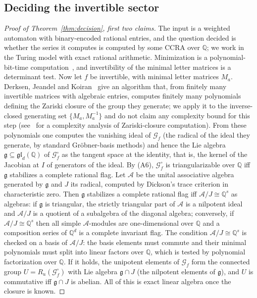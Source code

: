 \documentclass[acmlarge,screen,11pt,nonacm,natbib=false]{acmart}
\newcommand{\Q}{\mathbb{Q}}
\newcommand{\cG}{\mathcal{G}}
\newcommand{\cA}{\mathcal{A}}
\newcommand{\fg}{\mathfrak{g}}
\theoremstyle{definition}
\begin{document}
\subsection{Deciding the invertible sector}
\begin{proof}[Proof of Theorem~\ref{thm:decision}, first two claims]
The input is a weighted automaton with binary-encoded rational entries, and the question decided is whether the series it computes is computed by some CCRA over $\Q$; we work in the Turing model with exact rational arithmetic. Minimization is a polynomial-bit-time computation~\cite{Sch61,BR11,Tze92}, and invertibility of the minimal letter matrices is a determinant test. Now let $f$ be invertible, with minimal letter matrices $M_a$. Derksen, Jeandel and Koiran~\cite{DJK05} give an algorithm that, from finitely many invertible matrices with algebraic entries, computes finitely many polynomials defining the Zariski closure of the group they generate; we apply it to the inverse-closed generating set $\{M_a,M_a^{-1}\}$ and do not claim any complexity bound for this step (see~\cite{NPSSW22} for a complexity analysis of Zariski-closure computation). From these polynomials one computes the vanishing ideal of $\cG_f$ (the radical of the ideal they generate, by standard Gr\"obner-basis methods) and hence the Lie algebra $\fg\subseteq\mathfrak{gl}_d(\Q)$ of $\cG_f^\circ$ as the tangent space at the identity, that is, the kernel of the Jacobian at $I$ of generators of the ideal. By (A6), $\cG_f^\circ$ is triangularizable over $\Q$ iff $\fg$ stabilizes a complete rational flag. Let $\cA$ be the unital associative algebra generated by $\fg$ and $J$ its radical, computed by Dickson's trace criterion in characteristic zero. Then $\fg$ stabilizes a complete rational flag iff $\cA/J\cong\Q^s$ as algebras: if $\fg$ is triangular, the strictly triangular part of $\cA$ is a nilpotent ideal and $\cA/J$ is a quotient of a subalgebra of the diagonal algebra; conversely, if $\cA/J\cong\Q^s$ then all simple $\cA$-modules are one-dimensional over $\Q$ and a composition series of $\Q^d$ is a complete invariant flag. The condition $\cA/J\cong\Q^s$ is checked on a basis of $\cA/J$: the basis elements must commute and their minimal polynomials must split into linear factors over $\Q$, which is tested by polynomial factorization over $\Q$. If it holds, the unipotent elements of $\cG_f$ form the connected group $U=R_u(\cG_f^\circ)$ with Lie algebra $\fg\cap J$ (the nilpotent elements of $\fg$), and $U$ is commutative iff $\fg\cap J$ is abelian. All of this is exact linear algebra once the closure is known.
\end{proof}
\end{document}
